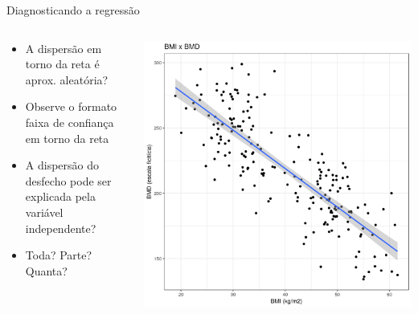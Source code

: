 \documentclass{beamer}
\begin{document}
\begin{frame}{Diagnosticando a regressão}
  \begin{columns}
    \begin{column}{5cm}
      \begin{itemize}
        \small
      \item \alert<2>{A dispersão em torno da reta é aprox. aleatória?}
        \bigskip
      \item Observe o formato faixa de confiança em torno da reta
        \bigskip
        \scriptsize
      \item A dispersão do desfecho pode ser explicada pela variável independente?
      \item Toda? Parte? Quanta?
      \end{itemize}
    \end{column}
    \begin{column}{5cm}
      \begin{center}
        \includegraphics[width=1.1\textwidth]{Cap18-19/pratica-rls2}
      \end{center}
    \end{column}
  \end{columns}
\end{frame}

\end{document}
